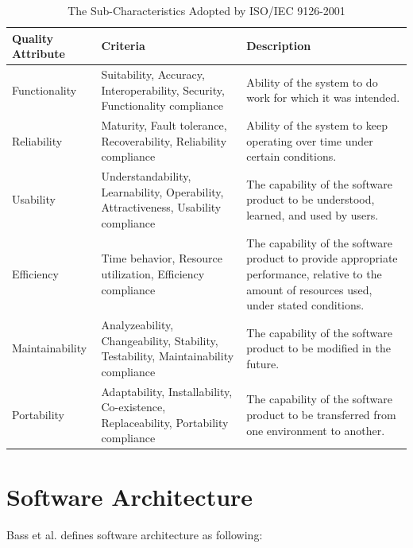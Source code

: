 \begin{table}[ht!]
	\centering
	\begin{tabular}{ | l | p{4cm} | p{6cm} |}
	\hline
	\textbf{Quality Attribute} & \textbf{Criteria} & \textbf{Description} \\ \hline
	Functionality 		&	Suitability, Accuracy, Interoperability, Security, Functionality compliance 	&	Ability of the system to do work for which it was intended. \\ \hline
	Reliability 		&	Maturity, Fault tolerance, Recoverability, Reliability compliance	&	Ability of the system to keep operating over time under certain conditions. \\ \hline
	Usability 			&	Understandability, Learnability, Operability, Attractiveness, Usability compliance 	 &	The capability of the software product to be understood, learned, and used by users. \\ \hline
	Efficiency 			&	Time behavior, Resource utilization, Efficiency compliance	 &	The capability of the software product to provide appropriate performance, relative to the amount of resources used, under stated conditions. \\ \hline
	Maintainability 	&	Analyzeability, Changeability, Stability, Testability, Maintainability compliance	 &	The capability of the software product to be modified in the future.\\ \hline
	Portability 		&	Adaptability, Installability, Co-existence, Replaceability, Portability compliance 	 &	The capability of the software product to be transferred from one environment to another. \\ \hline
	\end{tabular}
	\caption{The Sub-Characteristics Adopted by ISO/IEC 9126-2001} \label{tab:qattribute}
\end{table}







\section{Software Architecture}
\label{sec:2-SA}
Bass et al.\cite{Bass:2012:SAP:2392670} defines software architecture as following: 

